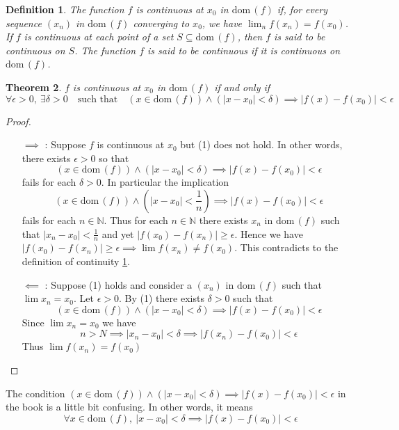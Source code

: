 \documentclass[12pt, lettersize]{book}
\newtheorem{thm}{Theorem}[section]
\newtheorem{dfn}[thm]{Definition}
\newcommand{\N}{\mathbb{N}}
\newcommand{\dom}{\text{dom}\,}
\begin{document}
	\begin{dfn}\label{def:continuous}
		The function $f$ is \emph{continuous} at $x_0$ in $\dom(f)$ if, for every sequence $(x_n)$ in $\dom(f)$ converging to $x_0$, we have $\lim_nf(x_n)=f(x_0)$. If $f$ is continuous at each point of a set $S\subseteq\dom(f)$, then $f$ is said to be \emph{continuous} on $S$. The function $f$ is said to be
		\emph{continuous} if it is continuous on $\dom(f)$.
	\end{dfn}
	
	\setcounter{equation}{0}
	\begin{thm}\label{def:delta-epsilon property}
		$f$ is continuous at $x_0$ in $\dom(f)$ if and only if
		\begin{equation}
			\forall\epsilon>0,\ \exists\delta>0\quad\text{such that}\quad(x\in\dom(f))\land(|x-x_0|<\delta)\implies|f(x)-f(x_0)|<\epsilon
		\end{equation}
	\end{thm}
	\begin{proof}
		\begin{itemize}
			\item[]
			\item[$\implies$]: Suppose $f$ is continuous at $x_0$ but (1) does not hold. In other words, there exists
			$\epsilon>0$ so that
			\begin{displaymath}
				(x\in\dom(f))\land(|x-x_0|<\delta)\implies|f(x)-f(x_0)|<\epsilon
			\end{displaymath}
			fails for each $\delta>0$. In particular the implication
			\begin{displaymath}
				(x\in\dom(f))\land(|x-x_0|<\frac{1}{n})\implies|f(x)-f(x_0)|<\epsilon
			\end{displaymath}
			fails for each $n\in\N$. Thus for each $n\in\N$ there exists $x_n$ in $\dom(f)$ such that $|x_n-x_0|<\frac{1}{n}$ and yet $|f(x_0)-f(x_n)|\geq\epsilon$. Hence we have $|f(x_0)-f(x_n)|\geq\epsilon\implies\lim f(x_n)\neq f(x_0)$. This contradicts to the definition of continuity \ref{def:continuous}.								
			\item[$\impliedby$]: Suppose (1) holds and consider a $(x_n)$ in $\dom(f)$ such that $\lim x_n=x_0$. Let
			$\epsilon>0$. By (1) there exists $\delta>0$ such that
			\begin{displaymath}
				(x\in\dom(f))\land(|x-x_0|<\delta)\implies|f(x)-f(x_0)|<\epsilon
			\end{displaymath}
			Since $\lim x_n=x_0$ we have
			\begin{displaymath}
				n>N\implies|x_n-x_0|<\delta\implies|f(x_n)-f(x_0)|<\epsilon
			\end{displaymath}
			Thus $\lim f(x_n)=f(x_0)$
		\end{itemize}
	\end{proof}
	The condition $(x\in\dom(f))\land(|x-x_0|<\delta)\implies|f(x)-f(x_0)|<\epsilon$ in the book is a little bit
	confusing. In other words, it means
	\begin{displaymath}
		\forall x\in\dom(f),\ |x-x_0|<\delta\implies|f(x)-f(x_0)|<\epsilon
	\end{displaymath}
	
\end{document}

